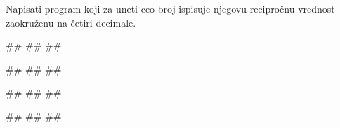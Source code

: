 \begin{Exercise}[label=v1.2_02] 
Napisati program koji za uneti ceo broj ispisuje njegovu recipročnu vrednost zaokruženu na četiri decimale.

\begin{miditest}
\begin{upotreba}{1}
#\naslovInt#
##
##
\end{upotreba}
\end{miditest}
\begin{miditest}
\begin{upotreba}{2}
#\naslovInt#
##
##
\end{upotreba}
\end{miditest}

\begin{miditest}
\begin{upotreba}{3}
#\naslovInt#
##
##
\end{upotreba}
\end{miditest}
\begin{miditest}
\begin{upotreba}{4}
#\naslovInt#
##
##
\end{upotreba}
\end{miditest}

\end{Exercise}
\begin{Answer}[ref=v1.2_02]
\end{Answer}


